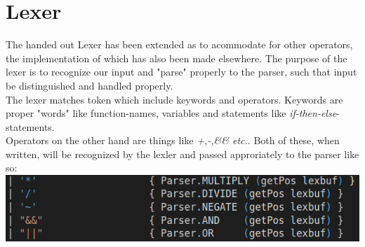 \section{Lexer}
The handed out Lexer has been extended as to acommodate for other operators, the implementation of which has also been made elsewhere.
The purpose of the lexer is to recognize our input and "parse" properly to the parser, such that input be distinguished and handled properly.\\
The lexer matches token which include keywords and operators. Keywords are proper "words" like function-names, variables and statements like \textit{if-then-else}-statements.\\
Operators on the other hand are things like \textit{+,-,\&\& etc.}. Both of these, when written, will be recognized by the lexler and passed approriately to the parser like so:\\
\includegraphics[width=\linewidth]{Materials/Lexer/Lexer}
